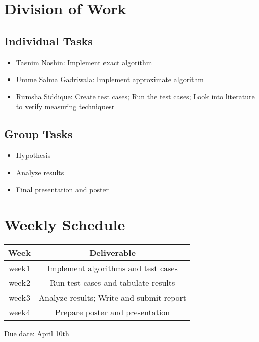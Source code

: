 \documentclass[letterpaper,12pt]{article}
\begin{document}
\section{Division of Work}


\subsection{Individual Tasks}
\begin{itemize}
\item  Tasnim Noshin: Implement exact algorithm
\item Umme Salma Gadriwala: Implement approximate algorithm
\item  Rumsha Siddique: Create test cases; Run the test cases; Look into literature to verify measuring techniquesr
\end{itemize}

   
\subsection{Group Tasks}
\begin{itemize}
\item  Hypothesis
\item Analyze results
\item  Final presentation and poster
\end{itemize}



\section{Weekly Schedule}


\begin{table}[ht]
\begin{center}

\label{tbl:bins} %
\begin{tabular}{|cc|} 
\hline
\multicolumn{1}{|c}{\textbf{Week}} & \multicolumn{1}{c|}{\textbf{Deliverable}} \\
\hline
week1 &  Implement algorithms and test cases \\
week2 &   Run test cases and tabulate results\\
week3 &   Analyze results; Write and submit report \\
week4 &   Prepare poster and presentation \\
\hline
\end{tabular}
\end{center}
\end{table}

Due date: April 10th
\end{document}
